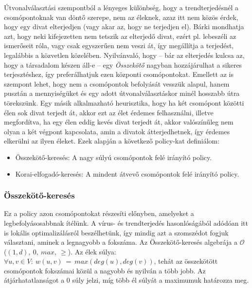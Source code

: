     Útvonalválasztási szempontból a lényeges különbség, hogy a trendterjedésnél a csomópontoknak van döntő szerepe, nem az éleknek, azaz itt nem közös érdek, hogy egy divat elterjedjen (vagy akar az, hogy ne terjedjen el). Bárki mondhatja azt, hogy neki kifejezetten nem tetszik az elterjedő divat, ezért pl. lebeszéli az ismerőseit róla, vagy csak egyszerűen nem veszi át, így megállítja a terjedést, legalábbis a közvetlen közelében. Nyilvánvaló, hogy -- bár az elterjedés kulcsa az, hogy a társadalom készen áll-e -- egy \textit{Összekötő} nagyban hozzájárulhat a sikeres terjesztéshez, így preferálhatjuk ezen központi csomópontokat. Emellett az is szempont lehet, hogy nem a csomópontok befolyását vesszük alapul, hanem pusztán a mennyiségüket és egy adott útvonalválasztáskor minél hosszabb útra törekszünk. Egy másik alkalmazható heurisztika, hogy ha két csomópont közötti élen sok divat terjedt át, akkor ezt az élet érdemes felhasználni, illetve megfordítva, ha egy élen eddig kevés divat terjedt át, akkor valószínűleg nem olyan a két végpont kapcsolata, amin a divatok átterjedhetnek, így érdemes elkerülni az ilyen éleket. Ezek alapján a következő policy-kat definiálom:

    \begin{itemize}
      \item Összekötő-keresés: A nagy súlyú csomópontok felé irányító policy.
      \item Korai-elfogadó-keresés: A mindent átvevő csomópontok felé irányító policy.
    \end{itemize}

      \subsubsection{Összekötő-keresés}\label{osszekoto_kereses}

      Ez a policy azon csomópontokat részesíti előnyben, amelyeket a legbefolyásosabbnak ítélünk. A vírus- és trendterjedés hasonlóságából adódóan itt is lokális optimalizálásról beszélhetünk, így mindig azt a szomszédot fogjuk választani, aminek a legnagyobb a fokszáma. Az Összekötő-keresés algebrája a $\mathcal{O}$ ($(1,d),~0,~max,~\geq$). Az élek súlya:
      $\forall u,v \in V:~w(u,v)~=~max(deg(u),deg(v))$, tehát az összekötött csomópontok fokszámai közül a nagyobb és nyilván a több jobb. Az átjárhatatlanságot a 0 súly jelzi, míg több él súlyát a maximumuk határozza meg.

